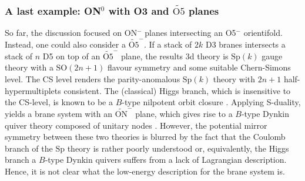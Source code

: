 \documentclass[a4paper,11pt]{article}
\newcommand{\sprm}{\mathrm{Sp}}
\newcommand{\sorm}{\mathrm{SO}}
\begin{document}
\subsubsection{\texorpdfstring{A last example: ON${}^0$ with O3 and $\widetilde{\mathrm{O5}}$ planes}{A last example: ON with O3 and tilde-O5 planes}}
So far, the discussion focused on ON${}^-$ planes intersecting an O5${}^-$ orientifold. Instead, one could also consider a $\widetilde{\mathrm{O5}}^-$. If a stack of $2k$ D3 branes intersects a stack of $n$ D5 on top of an $\widetilde{\mathrm{O5}}^-$ plane, the results 3d theory is $\sprm(k)$ gauge theory with a $\sorm(2n+1)$ flavour symmetry and some suitable Chern-Simons level. The CS level renders the parity-anomalous $\sprm(k)$ theory with $2n+1$ half-hypermultiplets consistent. The (classical) Higgs branch, which is insensitive to the CS-level, is known to be a $B$-type nilpotent orbit closure \cite{Hanany:2016gbz}. 
Applying S-duality, yields a brane system with an $\widetilde{\mathrm{ON}}^-$ plane, which gives rise to a $B$-type Dynkin quiver theory composed of unitary nodes \cite{Cremonesi:2014xha}. However, the potential mirror symmetry between these two theories is blurred by the fact that the Coulomb branch of the $\sprm$ theory is rather poorly understood or, equivalently, the Higgs branch a $B$-type Dynkin quivers suffers from a lack of Lagrangian description. Hence, it is not clear what the low-energy description for the brane system is.
\end{document}
